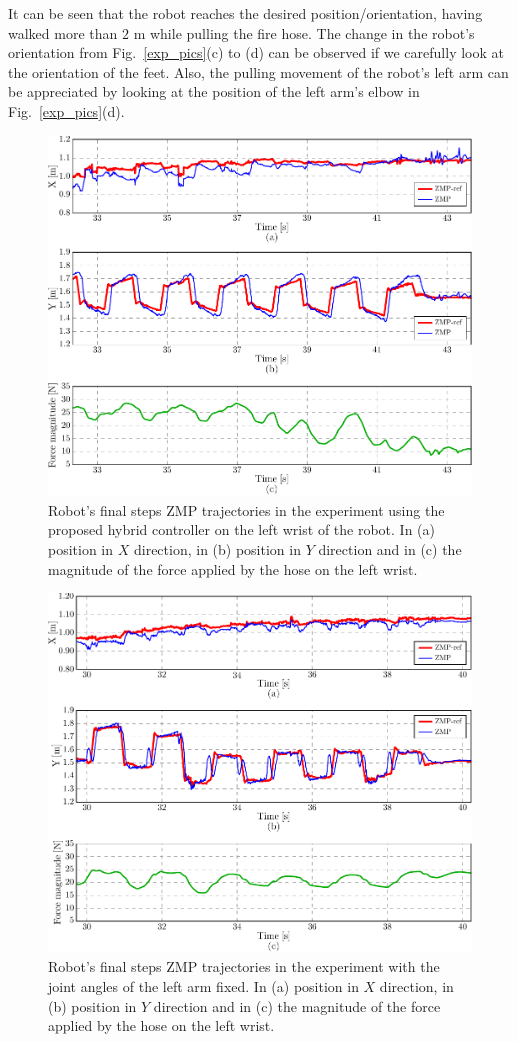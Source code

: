 %
%
It can be seen that the robot reaches the desired position/orientation, having walked more than $2$ m while pulling the fire hose.
%
The change in the robot's orientation from Fig.~\ref{exp_pics}(c) to (d) can be observed if we carefully look at the orientation of the feet.
%
Also, the pulling movement of the robot's left arm can be appreciated by looking at the position of the left arm's elbow in Fig.~\ref{exp_pics}(d). 



\begin{figure}[t]
 \centering
 \includegraphics[height=0.40\textwidth]{./figures/exp_ZMP_cont.pdf}
 \vspace{-7mm}
 \caption{Robot's final steps ZMP trajectories in the experiment using the proposed hybrid controller on the left wrist of the robot. In (a) position in $X$ direction, in (b) position in $Y$ direction and in (c) the magnitude of the force applied by the hose on the left wrist.}
 \label{zmp_cont}
\end{figure}
%
%
\begin{figure}[t]
 \centering
 \includegraphics[height=0.37\textwidth]{./figures/exp_ZMP_noCont.pdf}
 \vspace{-7mm}
 \caption{Robot's final steps ZMP trajectories in the experiment with the joint angles of the left arm fixed. In (a) position in $X$ direction, in (b) position in $Y$ direction and in (c) the magnitude of the force applied by the hose on the left wrist.}
 \label{zmp_nocont}
\end{figure}
%

